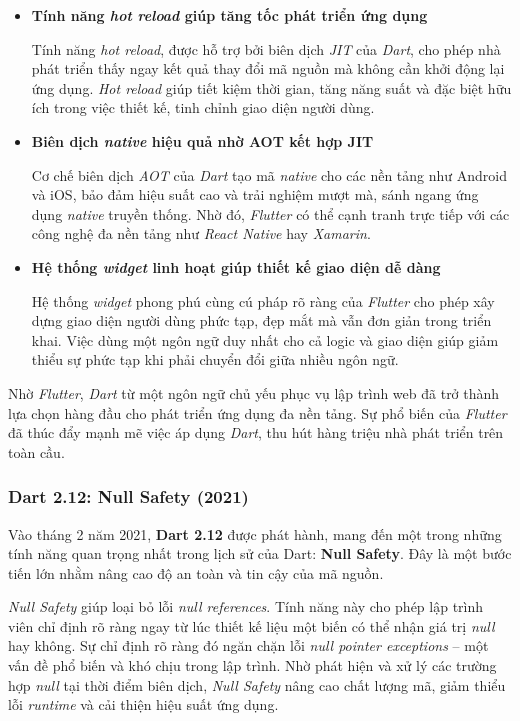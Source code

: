 \documentclass[../DoAn.tex]{subfiles}
\numberwithin{figure}{chapter}
\begin{document}
\begin{itemize}
    \item \textbf{Tính năng \textit{hot reload} giúp tăng tốc phát triển ứng dụng} 
    
    Tính năng \textit{hot reload}, được hỗ trợ bởi biên dịch \textit{JIT} của \textit{Dart}, cho phép nhà phát triển thấy ngay kết quả thay đổi mã nguồn mà không cần khởi động lại ứng dụng. \textit{Hot reload} giúp tiết kiệm thời gian, tăng năng suất và đặc biệt hữu ích trong việc thiết kế, tinh chỉnh giao diện người dùng.
    
    \item \textbf{Biên dịch \textit{native} hiệu quả nhờ AOT kết hợp JIT} 
    
    Cơ chế biên dịch \textit{AOT} của \textit{Dart} tạo mã \textit{native} cho các nền tảng như Android và iOS, bảo đảm hiệu suất cao và trải nghiệm mượt mà, sánh ngang ứng dụng \textit{native} truyền thống. Nhờ đó, \textit{Flutter} có thể cạnh tranh trực tiếp với các công nghệ đa nền tảng như \textit{React Native} hay \textit{Xamarin}.
    
    \item \textbf{Hệ thống \textit{widget} linh hoạt giúp thiết kế giao diện dễ dàng} 
    
    Hệ thống \textit{widget} phong phú cùng cú pháp rõ ràng của \textit{Flutter} cho phép xây dựng giao diện người dùng phức tạp, đẹp mắt mà vẫn đơn giản trong triển khai. Việc dùng một ngôn ngữ duy nhất cho cả logic và giao diện giúp giảm thiểu sự phức tạp khi phải chuyển đổi giữa nhiều ngôn ngữ.
\end{itemize}

Nhờ \textit{Flutter}, \textit{Dart} từ một ngôn ngữ chủ yếu phục vụ lập trình web đã trở thành lựa chọn hàng đầu cho phát triển ứng dụng đa nền tảng. Sự phổ biến của \textit{Flutter} đã thúc đẩy mạnh mẽ việc áp dụng \textit{Dart}, thu hút hàng triệu nhà phát triển trên toàn cầu.


\subsubsection{Dart 2.12: Null Safety (2021)}

Vào tháng 2 năm 2021, \textbf{Dart 2.12} được phát hành, mang đến một trong những tính năng quan trọng nhất trong lịch sử của Dart: \textbf{Null Safety}. Đây là một bước tiến lớn nhằm nâng cao độ an toàn và tin cậy của mã nguồn.

\textit{Null Safety} giúp loại bỏ lỗi \textit{null references}. Tính năng này cho phép lập trình viên chỉ định rõ ràng ngay từ lúc thiết kế liệu một biến có thể nhận giá trị \textit{null} hay không. Sự chỉ định rõ ràng đó ngăn chặn lỗi \textit{null pointer exceptions} – một vấn đề phổ biến và khó chịu trong lập trình. Nhờ phát hiện và xử lý các trường hợp \textit{null} tại thời điểm biên dịch, \textit{Null Safety} nâng cao chất lượng mã, giảm thiểu lỗi \textit{runtime} và cải thiện hiệu suất ứng dụng.
\end{document}
